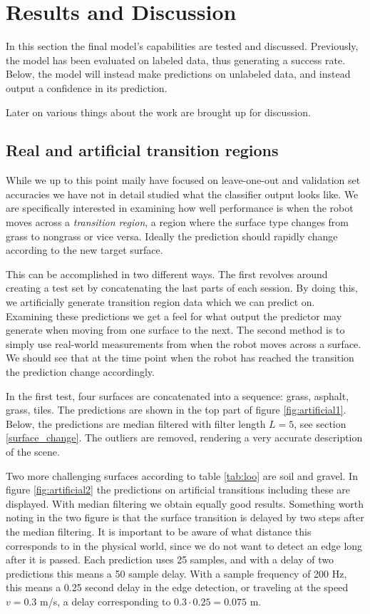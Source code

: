 \chapter{Results and Discussion}
In this section the final model's capabilities are tested and discussed. Previously, the model has been evaluated on labeled data, thus generating a success rate. Below, the model will instead make predictions on unlabeled data, and instead output a confidence in its prediction.

Later on various things about the work are brought up for discussion.

\section{Real and artificial transition regions}

While we up to this point maily have focused on leave-one-out and validation set accuracies we have not in detail studied what the classifier output looks like. We are specifically interested in examining how well performance is when the robot moves across a \emph{transition region}, a region where the surface type changes from grass to nongrass or vice versa. Ideally the prediction should rapidly change according to the new target surface. 

This can be accomplished in two different ways. The first revolves around creating a test set by concatenating the last parts of each session. By doing this, we artificially generate transition region data which we can predict on. Examining these predictions we get a feel for what output the predictor may generate when moving from one surface to the next. The second method is to simply use real-world measurements from when the robot moves across a surface. We should see that at the time point when the robot has reached the transition the prediction change accordingly. 

In the first test, four surfaces are concatenated into a sequence: grass, asphalt, grass, tiles. The predictions are shown in the top part of figure \ref{fig:artificial1}. Below, the predictions are median filtered with filter length $L=5$, see section \ref{surface_change}. The outliers are removed, rendering a very accurate description of the scene. 

Two more challenging surfaces according to table \ref{tab:loo} are soil and gravel. In figure \ref{fig:artificial2} the predictions on artificial transitions including these are displayed. With median filtering we obtain equally good results. Something worth noting in the two figure is that the surface transition is delayed by two steps after the median filtering. It is important to be aware of what distance this corresponds to in the physical world, since we do not want to detect an edge long after it is passed. Each prediction uses 25 samples, and with a delay of two predictions this means a 50 sample delay. With a sample frequency of 200 Hz, this means a 0.25 second delay in the edge detection, or traveling at the speed $v=0.3$ m/s, a delay corresponding to $0.3\cdot0.25=0.075$ m.

